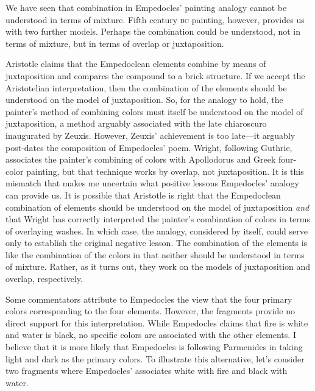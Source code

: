 We have seen that combination in Empedocles' painting analogy cannot be understood in terms of mixture. Fifth century \textsc{bc} painting, however, provides us with two further models. Perhaps the combination could be understood, not in terms of mixture, but in terms of overlap or juxtaposition. 

Aristotle claims that the Empedoclean elements combine by means of juxtaposition and compares the compound to a brick structure. If we accept the Aristotelian interpretation, then the combination of the elements should be understood on the model of juxtaposition. So, for the analogy to hold, the painter's method of combining colors must itself be understood on the model of juxtaposition, a method arguably associated with the late chiaroscuro inaugurated by Zeuxis. However, Zeuxis' achievement is too late---it arguably post-dates the composition of Empedocles' poem. Wright, following Guthrie, associates the painter's combining of colors with Apollodorus and Greek four-color painting, but that technique works by overlap, not juxtaposition. It is this mismatch that makes me uncertain what positive lessons Empedocles' analogy can provide us. It is possible that Aristotle is right that the Empedoclean combination of elements should be understood on the model of juxtaposition \emph{and} that Wright has correctly interpreted the painter's combination of colors in terms of overlaying washes. In which case, the analogy, considered by itself, could serve only to establish the original negative lesson. The combination of the elements is like the combination of the colors in that neither should be understood in terms of mixture. Rather, as it turns out, they work on the models of juxtaposition and overlap, respectively.

Some commentators attribute to Empedocles the view that the four primary colors corresponding to the four elements. However, the fragments provide no direct support for this interpretation. While Empedocles claims that fire is white and water is black, no specific colors are associated with the other elements. I believe that it is more likely that Empedocles is following Parmenides in taking light and dark as the primary colors. To illustrate this alternative, let's consider two fragments where Empedocles' associates white with fire and black with water. \change


